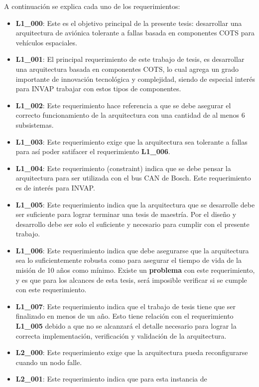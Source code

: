 A continuación se explica cada uno de los requerimientos:
\begin{itemize}
\item\textbf{L1\_000}: Este es el objetivo principal de la presente tesis:
  desarrollar una arquitectura de aviónica tolerante a fallas basada en
  componentes COTS para vehículos espaciales.
\item\textbf{L1\_001}: El principal requerimiento de este trabajo de tesis,
  es desarrollar una arquitectura basada en componentes COTS, lo cual agrega un
  grado importante de innovación tecnológica y complejidad, siendo de especial
  interés para INVAP trabajar con estos tipos de componentes.
\item\textbf{L1\_002}: Este requerimiento hace referencia a que se debe asegurar
  el correcto funcionamiento de la arquitectura con una cantidad de al menos
  6 subsistemas.
\item\textbf{L1\_003}: Este requerimiento exige que la arquitectura sea
  tolerante a fallas para así poder satifacer el requerimiento \textbf{L1\_006}.
\item\textbf{L1\_004}: Este requerimiento (constraint) indica que se debe pensar
  la arquitectura para ser utilizada con el bus CAN de Bosch. Este requerimiento
  es de interés para INVAP.
\item\textbf{L1\_005}: Este requerimiento indica que la arquitectura que se
  desarrolle debe ser suficiente para lograr terminar una tesis de maestría. Por
  el diseño y desarrollo debe ser solo el suficiente y necesario para cumplir
  con el presente trabajo.
\item\textbf{L1\_006}: Este requerimiento indica que debe asegurarse que la
  arquitectura sea lo suficientemente robusta como para asegurar el tiempo de
  vida de la misión de 10 años como mínimo. Existe un \textbf{problema} con este
  requerimiento, y es que para los alcances de esta tesis, será imposible
  verificar si se cumple con este requerimiento.
\item\textbf{L1\_007}: Este requerimiento indica que el trabajo de tesis tiene
  que ser finalizado en menos de un año. Esto tiene relación con el
  requerimiento \textbf{L1\_005} debido a que no se alcanzará el detalle
  necesario para lograr la correcta implementación, verificación y validación de
  la arquitectura.
\item\textbf{L2\_000}: Este requerimiento exige que la arquitectura pueda
  reconfigurarse cuando un nodo falle.
\item\textbf{L2\_001}: Este requerimiento indica que para esta instancia de

\end{itemize}
